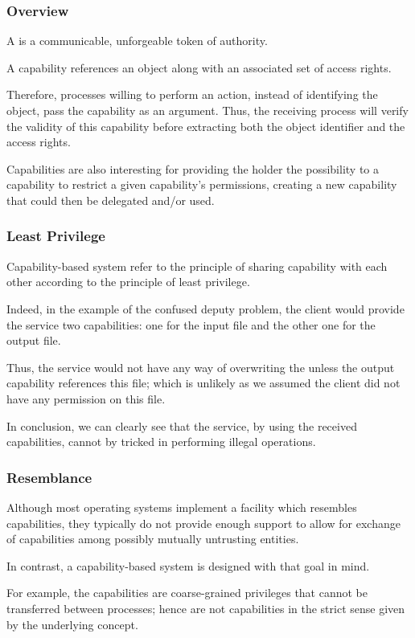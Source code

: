 
\begin{frame}
  \frametitle{Overview}

  A  is a communicable, unforgeable token of authority.

  \-

  A capability references an object along with an associated set of access
  rights.

  \-

  Therefore, processes willing to perform an action, instead of identifying
  the object, pass the capability as an argument. Thus, the receiving process
  will verify the validity of this capability before extracting both
  the object identifier and the access rights.

  \-

  Capabilities are also interesting for providing the holder the possibility
  to  a capability \ie{} to restrict a given capability's
  permissions, creating a new capability that could then be delegated and/or
  used.
\end{frame}


\begin{frame}
  \frametitle{Least Privilege}

  Capability-based system refer to the principle of sharing capability with
  each other according to the principle of least privilege.

  \-

  Indeed, in the example of the confused deputy problem, the client would
  provide the service two capabilities: one for the input file and the other
  one for the output file.

  \-

  Thus, the service would not have any way of overwriting the
   unless the output capability references this file;
  which is unlikely as we assumed the client did not have any permission
  on this file.

  \-

  In conclusion, we can clearly see that the service, by using the received
  capabilities, cannot by tricked in performing illegal operations.
\end{frame}


\begin{frame}
  \frametitle{Resemblance}

  Although most operating systems implement a facility which resembles
  capabilities, they typically do not provide enough support to allow
  for exchange of capabilities among possibly mutually untrusting entities.

  \-

  In contrast, a capability-based system is designed with that goal in mind.

  \-

  For example, the  capabilities are coarse-grained
  privileges that cannot be transferred between processes; hence are not
  capabilities in the strict sense given by the underlying concept.
\end{frame}

